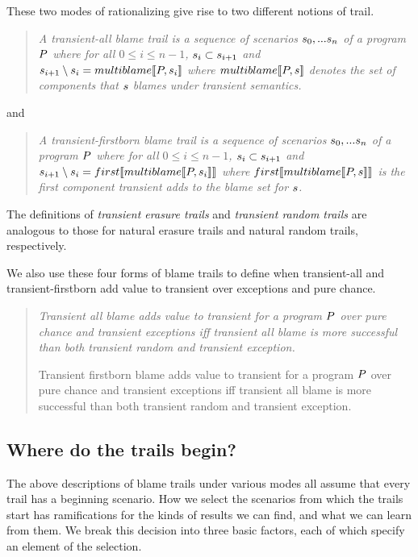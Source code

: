 These two modes of rationalizing give rise to two different notions of trail.
\begin{quote}
\it A \emph{ transient-all blame trail} is a sequence of scenarios
$s_0,...s_n$ of a program $P$ where for all $0 \leq i \leq n - 1$,
$s_i \subset s_{i+1}$ and ~$s_{i+1} \setminus s_i = multiblame\llbracket P,
s_i\rrbracket$ where $multiblame\llbracket P, s\rrbracket$ denotes the set of components that $s$
blames under transient semantics.
\end{quote}
\noindent
and
\begin{quote}
\it A \emph{transient-firstborn blame trail} is a sequence of scenarios
$s_0,...s_n$ of a program $P$ where for all $0 \leq i \leq n - 1$,
$s_i \subset s_{i+1}$ and $s_{i+1} \setminus s_i =
first\llbracket multiblame\llbracket P, s_i\rrbracket\rrbracket$ where $first\llbracket multiblame\llbracket P, s\rrbracket\rrbracket$ is the
first component transient adds to the blame set for $s$.
\end{quote}
The definitions of \emph{transient erasure trails} and \emph{transient random
trails} are analogous to those for natural erasure trails and natural random trails,
respectively. 

We also use these four forms of blame trails to define when transient-all and
transient-firstborn add value to transient over exceptions and pure chance.
\begin{quote}
\it 
Transient all blame adds value to transient for a program $P$ over
  pure chance and transient exceptions iff transient all blame 
  is more successful than both transient random and transient exception.

Transient firstborn blame adds value to transient for a program $P$ over
  pure chance and transient exceptions iff transient all blame 
  is more successful than both transient random and transient exception.

\end{quote}



\subsection{Where do the trails begin?}
The above descriptions of blame trails under various modes all assume that every trail has a beginning scenario.
How we select the scenarios from which the trails start has ramifications for the kinds of results we can find, and what we can learn from them.
We break this decision into three basic factors, each of which specify an element of the selection.


